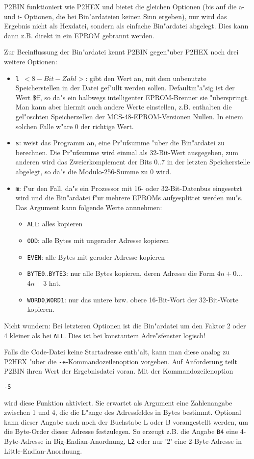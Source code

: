 \documentclass[12pt,a4paper,twoside]{report}
\newcommand{\tty}[1]{{\tt #1}}
\begin{document}
P2BIN funktioniert wie P2HEX und bietet die gleichen Optionen (bis
auf die a- und i- Optionen, die bei Bin"ardateien keinen Sinn ergeben), nur
wird das Ergebnis nicht als Hexdatei, sondern als einfache Bin"ardatei
abgelegt.  Dies kann dann z.B. direkt in ein EPROM gebrannt werden.
\par
Zur Beeinflussung der Bin"ardatei kennt P2BIN gegen"uber P2HEX noch
drei weitere Optionen:
\begin{itemize}
\item{\tty{l $<8-Bit-Zahl>$}: gibt den Wert an, mit dem unbenutzte
      Speicherstellen in der Datei gef"ullt werden sollen.
      Defaultm"a"sig ist der Wert \$ff, so da"s ein halbwegs
      intelligenter EPROM-Brenner sie "uberspringt.  Man kann aber
      hiermit auch andere Werte einstellen, z.B. enthalten die gel"oschten
      Speicherzellen der MCS-48-EPROM-Versionen Nullen.  In einem solchen
      Falle w"are 0 der richtige Wert.}
\item{\tty{s}: weist das Programm an, eine Pr"ufsumme "uber die Bin"ardatei zu
      berechnen.  Die Pr"ufsumme wird einmal als 32-Bit-Wert ausgegeben,
      zum anderen wird das Zweierkomplement der Bits 0..7 in der letzten
      Speicherstelle abgelegt, so da"s die Modulo-256-Summe zu 0 wird.}
\item{\tty{m}:  f"ur den Fall, da"s ein Prozessor mit 16- oder 32-Bit-Datenbus
      eingesetzt wird und die Bin"ardatei f"ur mehrere EPROMs aufgesplittet
      werden mu"s.  Das Argument kann folgende Werte annnehmen:
      \begin{itemize}
      \item{\tty{ALL}: alles kopieren}
      \item{\tty{ODD}: alle Bytes mit ungerader Adresse kopieren}
      \item{\tty{EVEN}: alle Bytes mit gerader Adresse kopieren}
      \item{\tty{BYTE0}..\tty{BYTE3}: nur alle Bytes kopieren, deren Adresse die Form
            $4n+0$...$4n+3$ hat.}
      \item{\tty{WORD0},\tty{WORD1}: nur das untere bzw. obere 16-Bit-Wort der
            32-Bit-Worte kopieren.}
      \end{itemize}}
\end{itemize}

Nicht wundern: Bei letzteren Optionen ist die Bin"ardatei um den Faktor 2
oder 4 kleiner als bei \tty{ALL}.  Dies ist bei konstantem Adre"sfenster logisch!

Falls die Code-Datei keine Startadresse enth"alt, kann man diese
analog zu P2HEX "uber die \tty{-e}-Kommandozeilenoption vorgeben.  Auf
Anforderung teilt P2BIN ihren Wert der Ergebnisdatei voran.  Mit der
Kommandozeilenoption
\begin{verbatim}
-S
\end{verbatim}
wird diese Funktion aktiviert.  Sie erwartet als Argument eine
Zahlenangabe zwischen 1 und 4,  die die L"ange des Adressfeldes in
Bytes bestimmt.  Optional kann dieser Angabe auch noch der Buchstabe
L oder B vorangestellt werden, um die Byte-Order dieser Adresse
festzulegen.  So erzeugt z.B. die Angabe \tty{B4} eine 4-Byte-Adresse in
Big-Endian-Anordnung, \tty{L2} oder nur '2' eine 2-Byte-Adresse in
Little-Endian-Anordnung.
\end{document}
